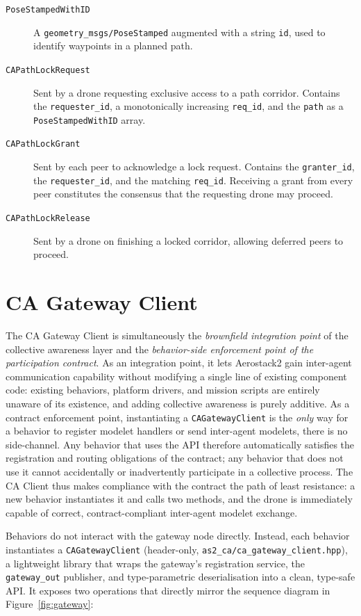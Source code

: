 \documentclass[deliverable]{csreport}
\renewcommand{\code}[1]{\texttt{\textcolor{CSMaroon}{#1}}}%
\newcommand{\tcode}[1]{\texttt{\textcolor{CSMaroon}{#1}}}
\begin{document}
\begin{description}
  \item[\tcode{PoseStampedWithID}] A \code{geometry\_msgs/PoseStamped} augmented with a string \code{id}, used to identify waypoints in a planned path.
  \item[\tcode{CAPathLockRequest}] Sent by a drone requesting exclusive access to a path corridor. Contains the \code{requester\_id}, a monotonically increasing \code{req\_id}, and the \code{path} as a \\ \code{PoseStampedWithID} array.
  \item[\tcode{CAPathLockGrant}] Sent by each peer to acknowledge a lock request. Contains the \code{granter\_id}, the \code{requester\_id}, and the matching \code{req\_id}. Receiving a grant from every peer constitutes the consensus that the requesting drone may proceed.
  \item[\tcode{CAPathLockRelease}] Sent by a drone on finishing a locked corridor, allowing deferred peers to proceed.
\end{description}

\section{CA Gateway Client}

The CA Gateway Client is simultaneously the \emph{brownfield integration point} of the collective awareness layer and the \emph{behavior-side enforcement point of the participation contract}. As an integration point, it lets Aerostack2 gain inter-agent communication capability without modifying a single line of existing component code: existing behaviors, platform drivers, and mission scripts are entirely unaware of its existence, and adding collective awareness is purely additive. As a contract enforcement point, instantiating a \code{CAGatewayClient} is the \emph{only} way for a behavior to register modelet handlers or send inter-agent modelets, there is no side-channel. Any behavior that uses the API therefore automatically satisfies the registration and routing obligations of the contract; any behavior that does not use it cannot accidentally or inadvertently participate in a collective process. The CA Client thus makes compliance with the contract the path of least resistance: a new behavior instantiates it and calls two methods, and the drone is immediately capable of correct, contract-compliant inter-agent modelet exchange.

Behaviors do not interact with the gateway node directly. Instead, each behavior instantiates a \code{CAGatewayClient} (header-only, \code{as2\_ca/ca\_gateway\_client.hpp}), a lightweight library that wraps the gateway's registration service, the \code{gateway\_out} publisher, and type-parametric deserialisation into a clean, type-safe API. It exposes two operations that directly mirror the sequence diagram in Figure~\ref{fig:gateway}:
\end{document}

